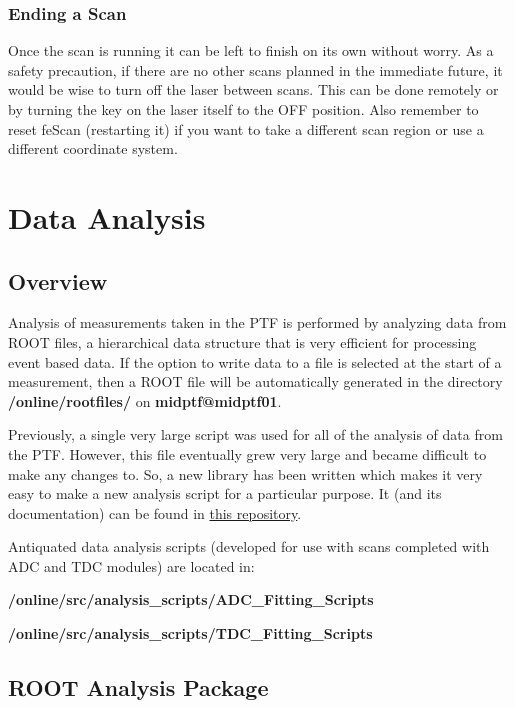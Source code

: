 \documentclass[twoside,letterpaper]{refart}
\begin{document}
\subsubsection{Ending a Scan}

Once the scan is running it can be left to finish on its own without worry. As a safety precaution, if there are no other scans planned in the immediate future, it would be wise to turn off the laser between scans. This can be done remotely or by turning the key on the laser itself to the OFF position. Also remember to reset feScan (restarting it) if you want to take a different scan region or use a different coordinate system.



\clearpage
\section{Data Analysis}

\subsection{Overview}\label{dataAnalysisFiles}

Analysis of measurements taken in the PTF is performed by analyzing data from ROOT files, a hierarchical data structure that is very efficient for processing event based data. If the option to write data to a file is selected at the start of a measurement, then a ROOT file will be automatically generated in the directory \textbf{/online/rootfiles/} on \textbf{midptf@midptf01}.

Previously, a single very large script was used for all of the analysis of data from the PTF. However, this file eventually grew very large and became difficult to make any changes to. So, a new library has been written which makes it very easy to make a new analysis script for a particular purpose. It (and its documentation) can be found in \href{https://bitbucket.org/ttriumfdaq/ptf-analysis-2}{this repository}.

Antiquated data analysis scripts (developed for use with scans completed with ADC and TDC modules) are located in:

\textbf{/online/src/analysis\_scripts/ADC\_Fitting\_Scripts}

\textbf{/online/src/analysis\_scripts/TDC\_Fitting\_Scripts}

\subsection{ROOT Analysis Package}
\end{document}
